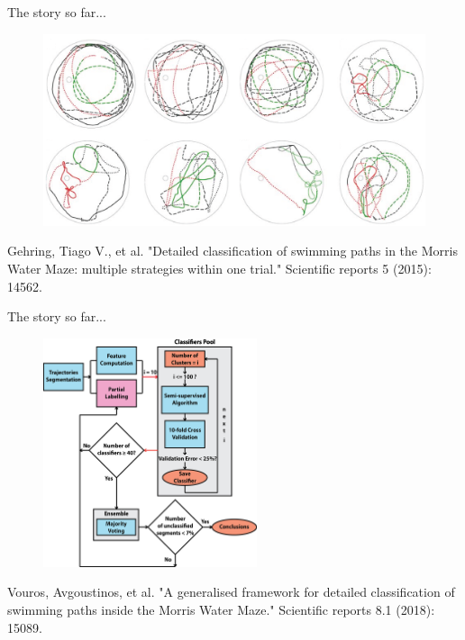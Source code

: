 \documentclass{beamer}
\begin{document}
{\begin{frame}{The story so far...}
	\begin{figure}[H]
		\centering
		\includegraphics[width=\textwidth]{figures/gehringetal}
	\end{figure}
	\vspace{4mm}
	\tiny{Gehring, Tiago V., et al. "Detailed classification of swimming paths in the Morris Water Maze: multiple strategies within one trial." Scientific reports 5 (2015): 14562.}		
\end{frame}

\begin{frame}{The story so far...}
	\begin{figure}[H]
		\centering
		\includegraphics[width=0.56\textwidth]{figures/vourosetal}
	\end{figure}
	\tiny{Vouros, Avgoustinos, et al. "A generalised framework for detailed classification of swimming paths inside the Morris Water Maze." Scientific reports 8.1 (2018): 15089.}		
\end{frame}

}
\end{document}
